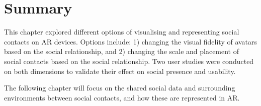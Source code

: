 \section{Summary}

This chapter explored different options of visualising and representing social contacts on AR devices. Options include: 1) changing the visual fidelity of avatars based on the social relationship, and 2) changing the scale and placement of social contacts based on the social relationship. Two user studies were conducted on both dimensions to validate their effect on social presence and usability. 

The following chapter will focus on the shared social data and surrounding environments between social contacts, and how these are represented in AR. 